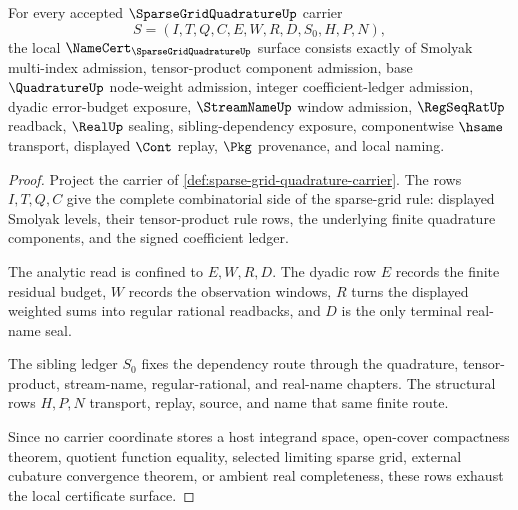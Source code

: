 \begin{theorem}
\label{thm:sparse-grid-quadrature-namecert-obligations}
For every accepted $\SparseGridQuadratureUp$ carrier
$$
S=(I,T,Q,C,E,W,R,D,S_0,H,P,N),
$$
the local $\NameCert_{\SparseGridQuadratureUp}$ surface consists exactly of Smolyak multi-index admission, tensor-product component admission, base $\QuadratureUp$ node-weight admission, integer coefficient-ledger admission, dyadic error-budget exposure, $\StreamNameUp$ window admission, $\RegSeqRatUp$ readback, $\RealUp$ sealing, sibling-dependency exposure, componentwise $\hsame$ transport, displayed $\Cont$ replay, $\Pkg$ provenance, and local naming.
\end{theorem}
\begin{proof}
Project the carrier of \autoref{def:sparse-grid-quadrature-carrier}. The rows $I,T,Q,C$ give the complete combinatorial side of the sparse-grid rule: displayed Smolyak levels, their tensor-product rule rows, the underlying finite quadrature components, and the signed coefficient ledger.

The analytic read is confined to $E,W,R,D$. The dyadic row $E$ records the finite residual budget, $W$ records the observation windows, $R$ turns the displayed weighted sums into regular rational readbacks, and $D$ is the only terminal real-name seal.

The sibling ledger $S_0$ fixes the dependency route through the quadrature, tensor-product, stream-name, regular-rational, and real-name chapters. The structural rows $H,P,N$ transport, replay, source, and name that same finite route.

Since no carrier coordinate stores a host integrand space, open-cover compactness theorem, quotient function equality, selected limiting sparse grid, external cubature convergence theorem, or ambient real completeness, these rows exhaust the local certificate surface.
\end{proof}

